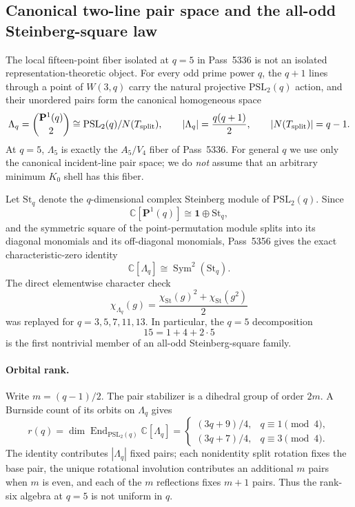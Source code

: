 \subsection{Canonical two-line pair space and the all-odd Steinberg-square law}
\label{sec:pass5356-pair-steinberg}

The local fifteen-point fiber isolated at $q=5$ in Pass~5336 is not an
isolated representation-theoretic object.  For every odd prime power $q$, the
$q+1$ lines through a point of $W(3,q)$ carry the natural projective
$\mathrm{PSL}_2(q)$ action, and their unordered pairs form the canonical homogeneous
space
\[
 \Lambda_q=\binom{\mathbf P^1(q)}2
 \cong \mathrm{PSL}_2(q)/N(T_{\rm split}),
 \qquad
 |\Lambda_q|=\frac{q(q+1)}2,
 \qquad
 |N(T_{\rm split})|=q-1.
\]
At $q=5$, $\Lambda_5$ is exactly the $A_5/V_4$ fiber of Pass~5336.  For
general $q$ we use only the canonical incident-line pair space; we do
\emph{not} assume that an arbitrary minimum $K_0$ shell has this fiber.

Let $\mathrm{St}_q$ denote the $q$-dimensional complex Steinberg module of
$\mathrm{PSL}_2(q)$.  Since
\[
 \mathbb C[\mathbf P^1(q)]\cong \mathbf 1\oplus \mathrm{St}_q,
\]
and the symmetric square of the point-permutation module splits into its
diagonal monomials and its off-diagonal monomials, Pass~5356 gives the exact
characteristic-zero identity
\[
 \boxed{
 \mathbb C[\Lambda_q]\cong \operatorname{Sym}^2(\mathrm{St}_q).
 }
\]
The direct elementwise character check
\[
 \chi_{\Lambda_q}(g)
 =\frac{\chi_{\mathrm{St}}(g)^2+\chi_{\mathrm{St}}(g^2)}2
\]
was replayed for $q=3,5,7,11,13$.  In particular, the $q=5$ decomposition
\[
 15=1+4+2\cdot5
\]
is the first nontrivial member of an all-odd Steinberg-square family.

\paragraph{Orbital rank.}
Write $m=(q-1)/2$.  The pair stabilizer is a dihedral group of order $2m$.
A Burnside count of its orbits on $\Lambda_q$ gives
\[
 \boxed{
 r(q)=\dim\operatorname{End}_{\mathrm{PSL}_2(q)}\mathbb C[\Lambda_q]
 =\begin{cases}
 (3q+9)/4,&q\equiv1\pmod4,\\[2mm]
 (3q+7)/4,&q\equiv3\pmod4.
 \end{cases}}
\]
The identity contributes $|\Lambda_q|$ fixed pairs; each nonidentity split
rotation fixes the base pair, the unique rotational involution contributes an
additional $m$ pairs when $m$ is even, and each of the $m$ reflections fixes
$m+1$ pairs.  Thus the rank-six algebra at $q=5$ is not uniform in $q$.

